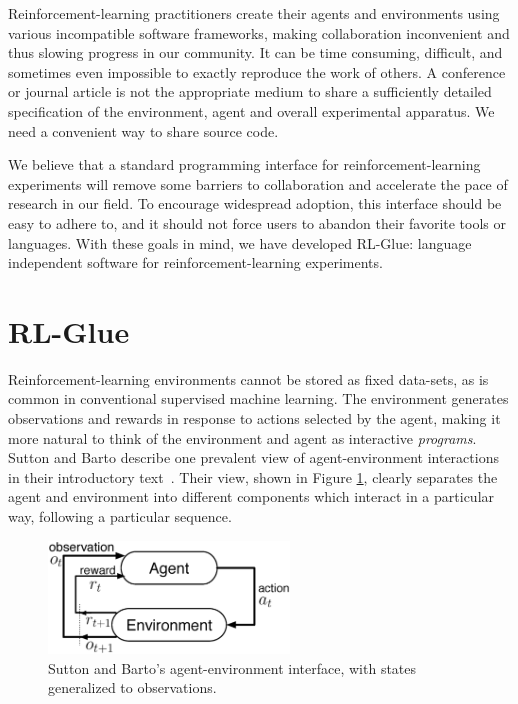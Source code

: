 \documentclass[twoside,11pt]{article}
\begin{document}
Reinforcement-learning practitioners create their agents and environments using various incompatible software frameworks, making collaboration inconvenient and thus slowing progress in our community.  It can be time consuming, difficult, and sometimes even impossible to exactly reproduce the work of others.  A conference or journal article is not the appropriate medium to share a sufficiently detailed specification of the environment, agent and overall experimental apparatus.  We need a convenient way to share source code.

We believe that a standard programming interface for reinforcement-learning experiments will remove some barriers to collaboration and accelerate the pace of research in our field.  To encourage widespread adoption, this interface should be easy to adhere to, and it should not force users to abandon their favorite tools or languages.  With these goals in mind, we have developed RL-Glue: language independent software for reinforcement-learning experiments.


\section{RL-Glue}
Reinforcement-learning environments cannot be stored as fixed data-sets, as is common in conventional supervised machine learning.  The environment generates observations and rewards in response to actions selected by the agent, making it more natural to think of the environment and agent as interactive \textit{programs}.  Sutton and Barto describe one prevalent view of agent-environment interactions in their introductory text~\citeyearpar{rlbook}.  Their view, shown in Figure \ref{fig:agent-env}, clearly separates the agent and environment into different components which interact in a particular way, following a particular sequence.   

\vspace{-0.3cm}
\begin{figure}[ht]
\begin{center}
\includegraphics[height=3cm]{figures/agent-env.eps}
\vspace{-0.4cm}
\caption{Sutton and Barto's agent-environment interface, with states generalized to observations.}
\label{fig:agent-env}
\end{center}
\end{figure}
\end{document}

